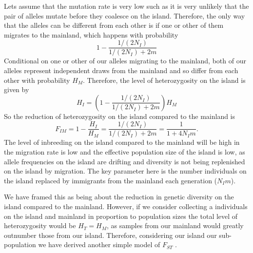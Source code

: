 Lets assume that the mutation rate is very low such as it is very
unlikely that the pair of alleles mutate before they coalesce on the
island. Therefore, the only way that the alleles can be different from
each other is if one or other of them migrates to the mainland, which
happens with probability  
\begin{equation}
1 - \frac{1/(2N_I) }{1/(2N_I) + 2m}
\end{equation}
Conditional on one or other of our alleles migrating to the mainland,
both of our alleles represent independent draws from the mainland and
so differ from each other with probability $H_M$. Therefore, the level of
heterozygosity on the island is given by
\begin{equation}
H_I = (1 - \frac{1/(2N_I) }{1/(2N_I) + 2m})H_M
\end{equation}
So the reduction of heterozygosity on the island compared to the
mainland is
\begin{equation}
F_{IM} = 1- \frac{H_I}{H_M} = \frac{ 1/(2N_I) }{1/(2N_I) + 2m} = \frac{ 1 }{1 + 4N_Im}.
\end{equation}
The level of inbreeding on the island compared to the mainland will
be high in the migration rate is low and the effective population size
of the island is low, as allele frequencies on the island are drifting
and diversity is not being replenished on the island by migration. The
key parameter here is the number individuals on the island replaced by
immigrants from the mainland each generation ($N_I m$).

We have framed this as being about the reduction in genetic diversity on the
island compared to the mainland. However, if we consider collecting a
individuals on the island and mainland in proportion to population
sizes the total level of heterozygosity would be $H_T=H_M$, as samples
from our mainland would greatly outnumber those from our
island. Therefore, considering our island our sub-population we have
derived another simple model of $F_{ST}$ .


\newpage

